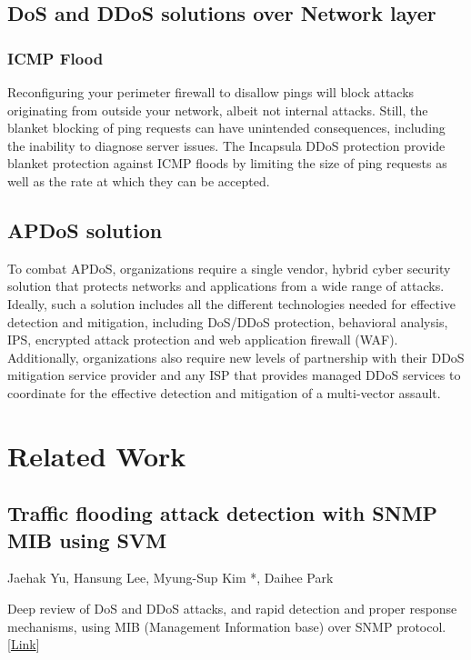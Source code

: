 \documentclass{report}
\begin{document}
\section {DoS and DDoS solutions over Network layer} 

\subsection {ICMP Flood} Reconfiguring your perimeter firewall to disallow pings will block attacks originating from outside your network, albeit not internal attacks. Still, the blanket blocking of ping requests can have unintended consequences, including the inability to diagnose server issues.
The Incapsula DDoS protection provide blanket protection against ICMP floods by limiting the size of ping requests as well as the rate at which they can be accepted.

 \hfill \break

\section {APDoS solution}

 \hfill \break To combat APDoS, organizations require a single vendor, hybrid cyber security solution that protects networks and applications from a wide range of attacks. Ideally, such a solution includes all the different technologies needed for effective detection and mitigation, including DoS/DDoS protection, behavioral analysis, IPS, encrypted attack protection and web application firewall (WAF). Additionally, organizations also require new levels of partnership with their DDoS mitigation service provider and any ISP that provides managed DDoS services to coordinate for the effective detection and mitigation of a multi-vector assault.

\newpage


\chapter {Related Work}

\section {Traffic flooding attack detection with SNMP MIB using SVM}
 {\footnotesize  Jaehak Yu, Hansung Lee, Myung-Sup Kim *, Daihee Park}

Deep review of DoS and DDoS attacks, and rapid detection and proper response mechanisms, using MIB (Management Information base) over SNMP protocol.
[\href{http://www.sciencedirect.com/science/article/pii/S0140366408005094}{Link}]
  \hfill \break
\end{document}
